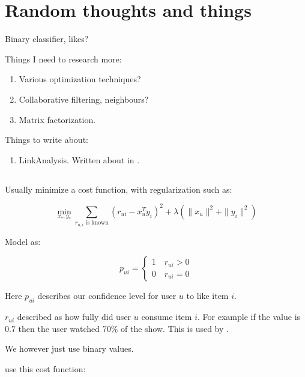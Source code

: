 \section{Random thoughts and things}

Binary classifier, likes?

Things I need to research more:

\begin{enumerate}
    \item Various optimization techniques?
    \item Collaborative filtering, neighbours? \cite{hu2008collaborative}
    \item Matrix factorization.
\end{enumerate}

Things to write about:

\begin{enumerate}
    \item LinkAnalysis. Written about in \cite{huang2007comparison}.
\end{enumerate}


\subsection{\cite{hu2008collaborative}}

Usually minimize a cost function, with regularization such as:

\begin{equation}
    \min_{x_*, y_*} \sum_{r_{u,i} \text{ is known} } (r_{ui} - x_{u}^T y_i)^2 + \lambda(\|x_u\|^2 + \|y_i\|^2)
\end{equation}

Model as:

\begin{equation}
    p_{ui} = \begin{cases}
        1 \quad r_{ui} > 0 \\
        0 \quad r_{ui} = 0
    \end{cases}
\end{equation}

Here $p_{ui}$ describes our confidence level for user $u$ to like item $i$.

$r_{ui}$ described as how fully did user $u$ consume item $i$. For example if the value is $0.7$ then the user watched $70\%$ of the show. This is used by \cite{hu2008collaborative}.

We however just use binary values.

\cite{hu2008collaborative} use this cost function:

